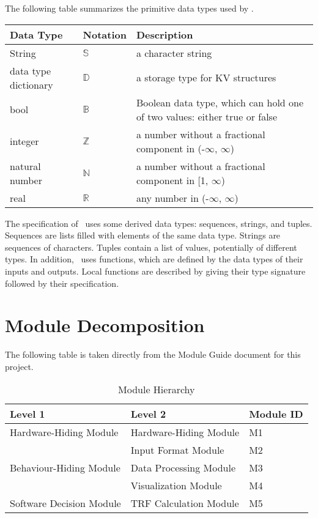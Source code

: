 \documentclass[12pt, titlepage]{article}
\begin{document}
The following table summarizes the primitive data types used by \progname.

\begin{center}
\renewcommand{\arraystretch}{1.2}
\noindent
\begin{tabular}{l l p{7.5cm}}
\toprule
\textbf{Data Type} & \textbf{Notation} & \textbf{Description}\\
\midrule
String & $\mathbb{S}$ & a character string \\
data type dictionary & $\mathbb{D}$ & a storage type for KV structures \\
bool & $\mathbb{B}$ &  Boolean data type, which can hold one of two values: either true or false \\
integer & $\mathbb{Z}$ & a number without a fractional component in (-$\infty$, $\infty$) \\
natural number & $\mathbb{N}$ & a number without a fractional component in [1, $\infty$) \\
real & $\mathbb{R}$ & any number in (-$\infty$, $\infty$)\\
\bottomrule
\end{tabular}
\end{center}

\noindent
The specification of \progname \ uses some derived data types: sequences, strings, and
tuples. Sequences are lists filled with elements of the same data type. Strings
are sequences of characters. Tuples contain a list of values, potentially of
different types. In addition, \progname \ uses functions, which
are defined by the data types of their inputs and outputs. Local functions are
described by giving their type signature followed by their specification.

\section{Module Decomposition}

The following table is taken directly from the Module Guide document for this project.

\begin{table}[h!]
\centering
\begin{tabular}{p{} p{}p{}}
\toprule
\textbf{Level 1} & \textbf{Level 2}& \textbf{Module ID}\\
\midrule

{Hardware-Hiding Module} &  Hardware-Hiding Module
 & M1 \\
\midrule

\multirow{3}{0.3\textwidth}{Behaviour-Hiding Module}
& Input Format Module & M2\\
& Data Processing Module & M3\\
& Visualization Module & M4\\

\midrule

\multirow{1}{0.3\textwidth}{Software Decision Module} & TRF Calculation Module & M5\\
\bottomrule

\end{tabular}
\caption{Module Hierarchy}
\label{TblMH}
\end{table}
\end{document}
